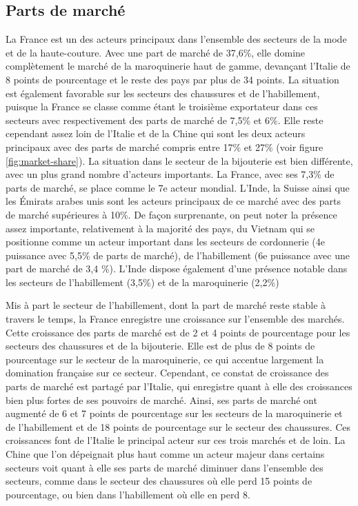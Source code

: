 \documentclass[french,10pt,a4paper]{article}
\begin{document}
\subsection{Parts de marché}

La France est un des acteurs principaux dans l'ensemble des secteurs de la mode et de la haute-couture. Avec une part de marché de 37,6\%, elle domine complètement le marché de la maroquinerie haut de gamme, devançant l'Italie de 8 points de pourcentage et le reste des pays par plus de 34 points. La situation est également favorable sur les secteurs des chaussures et de l'habillement, puisque la France se classe comme étant le troisième exportateur dans ces secteurs avec respectivement des parts de marché de 7,5\% et 6\%. Elle reste cependant assez loin de l'Italie et de la Chine qui sont les deux acteurs principaux avec des parts de marché compris entre 17\% et 27\% (voir figure \ref{fig:market-share}). La situation dans le secteur de la bijouterie est bien différente, avec un plus grand nombre d'acteurs importants. La France, avec ses 7,3\% de parts de marché, se place comme le 7e acteur mondial. L'Inde, la Suisse ainsi que les Émirats arabes unis sont les acteurs principaux de ce marché avec des parts de marché supérieures à 10\%. De façon surprenante, on peut noter la présence assez importante, relativement à la majorité des pays, du Vietnam qui se positionne comme un acteur important dans les secteurs de cordonnerie (4e puissance avec 5,5\% de parts de marché), de l'habillement (6e puissance avec une part de marché de 3,4 \%). L'Inde dispose également d'une présence notable dans les secteurs de l'habillement (3,5\%) et de la maroquinerie (2,2\%)

Mis à part le secteur de l'habillement, dont la part de marché reste stable à travers le temps, la France enregistre une croissance sur l'ensemble des marchés. Cette croissance des parts de marché est de 2 et 4 points de pourcentage pour les secteurs des chaussures et de la bijouterie. Elle est de plus de 8 points de pourcentage sur le secteur de la maroquinerie, ce qui accentue largement la domination française sur ce secteur. Cependant, ce constat de croissance des parts de marché est partagé par l'Italie, qui enregistre quant à elle des croissances bien plus fortes de ses pouvoirs de marché. Ainsi, ses parts de marché ont augmenté de 6 et 7 points de pourcentage sur les secteurs de la maroquinerie et de l'habillement et de 18 points de pourcentage sur le secteur des chaussures. Ces croissances font de l'Italie le principal acteur sur ces trois marchés et de loin. La Chine que l'on dépeignait plus haut comme un acteur majeur dans certains secteurs voit quant à elle ses parts de marché diminuer dans l'ensemble des secteurs, comme dans le secteur des chaussures où elle perd 15 points de pourcentage, ou bien dans l'habillement où elle en perd 8. 
\end{document}
